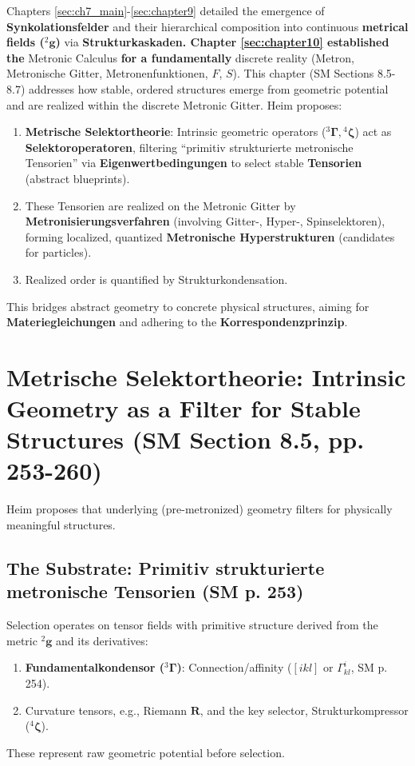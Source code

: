 \documentclass[
    12pt,              %
    a4paper,           %
    headings=normal,   %
    twoside=true,      %
    BCOR=8mm,          %
]{scrbook}
\newcommand{\q}[1]{\enquote{#1}}
\newcommand{\kompositionsfeld}{{}^2\mathbf{g}}
\newcommand{\fundamentalkondensor}{{}^3\bm{\Gamma}}
\newcommand{\strukturkompressor}{{}^4\bm{\zeta}}
\begin{document}
Chapters \ref{sec:ch7_main}-\ref{sec:chapter9} detailed the emergence of \textbf{Synkolationsfelder} and their hierarchical composition into continuous \textbf{metrical fields (\(\kompositionsfeld\))} via \textbf{Strukturkaskaden. Chapter \ref{sec:chapter10} established the }Metronic Calculus\textbf{ for a fundamentally }discrete reality (Metron, Metronische Gitter, Metronenfunktionen, \(F\), \(S\)). This chapter (SM Sections 8.5-8.7) addresses how stable, ordered structures emerge from geometric potential and are realized within the discrete Metronic Gitter.
Heim proposes:
\begin{enumerate}
    \item  \textbf{Metrische Selektortheorie}: Intrinsic geometric operators (\(\fundamentalkondensor, \strukturkompressor\)) act as \textbf{Selektoroperatoren}, filtering \q{primitiv strukturierte metronische Tensorien} via \textbf{Eigenwertbedingungen} to select stable \textbf{Tensorien} (abstract blueprints).
    \item  These Tensorien are realized on the Metronic Gitter by \textbf{Metronisierungsverfahren} (involving Gitter-, Hyper-, Spinselektoren), forming localized, quantized \textbf{Metronische Hyperstrukturen} (candidates for particles).
    \item  Realized order is quantified by Strukturkondensation.
\end{enumerate}
This bridges abstract geometry to concrete physical structures, aiming for \textbf{Materiegleichungen} and adhering to the \textbf{Korrespondenzprinzip}.

\section{Metrische Selektortheorie: Intrinsic Geometry as a Filter for Stable Structures (SM Section 8.5, pp. 253-260)}
\label{sec:ch11_1_selektortheorie}

Heim proposes that underlying (pre-metronized) geometry filters for physically meaningful structures.

\subsection{The Substrate: Primitiv strukturierte metronische Tensorien (SM p. 253)}
\label{sec:ch11_1_1_substrat_tensorien}
Selection operates on tensor fields with primitive structure derived from the metric \(\kompositionsfeld\) and its derivatives:
\begin{enumerate}
    \item  \textbf{Fundamentalkondensor (\(\fundamentalkondensor\))}: Connection/affinity (\([ikl]\) or \(\Gamma^i_{kl}\), SM p. 254).
    \item  Curvature tensors, e.g., Riemann \(\mathbf{R}\), and the key selector, Strukturkompressor (\(\strukturkompressor\)).
\end{enumerate}
These represent raw geometric potential before selection.
\end{document}
